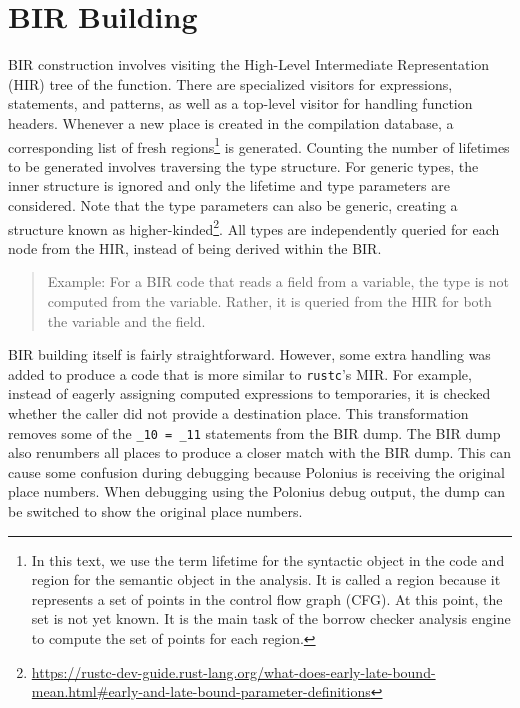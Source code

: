 \documentclass[
  11pt,
  twoside]{report}
\DeclareRobustCommand{\href}[2]{#2\footnote{\url{#1}}}
\begin{document}
\section{BIR Building}\label{sec:bir-building}

BIR construction involves visiting the High-Level Intermediate
Representation (HIR) tree of the function. There are specialized
visitors for expressions, statements, and patterns, as well as a
top-level visitor for handling function headers. Whenever a new place is
created in the compilation database, a corresponding list of fresh
regions\footnote{In this text, we use the term lifetime for the
  syntactic object in the code and region for the semantic object in the
  analysis. It is called a region because it represents a set of points
  in the control flow graph (CFG). At this point, the set is not yet
  known. It is the main task of the borrow checker analysis engine to
  compute the set of points for each region.} is generated. Counting the
number of lifetimes to be generated involves traversing the type
structure. For generic types, the inner structure is ignored and only
the lifetime and type parameters are considered. Note that the type
parameters can also be generic, creating a structure known as
\href{https://rustc-dev-guide.rust-lang.org/what-does-early-late-bound-mean.html\#early-and-late-bound-parameter-definitions}{higher-kinded}.
All types are independently queried for each node from the HIR, instead
of being derived within the BIR.

\begin{quote}
Example: For a BIR code that reads a field from a variable, the type is
not computed from the variable. Rather, it is queried from the HIR for
both the variable and the field.
\end{quote}

BIR building itself is fairly straightforward. However, some extra
handling was added to produce a code that is more similar to
\texttt{rustc}'s MIR. For example, instead of eagerly assigning computed
expressions to temporaries, it is checked whether the caller did not
provide a destination place. This transformation removes some of the
\texttt{\_10\ =\ \_11} statements from the BIR dump. The BIR dump also
renumbers all places to produce a closer match with the BIR dump. This
can cause some confusion during debugging because Polonius is receiving
the original place numbers. When debugging using the Polonius debug
output, the dump can be switched to show the original place numbers.
\end{document}
